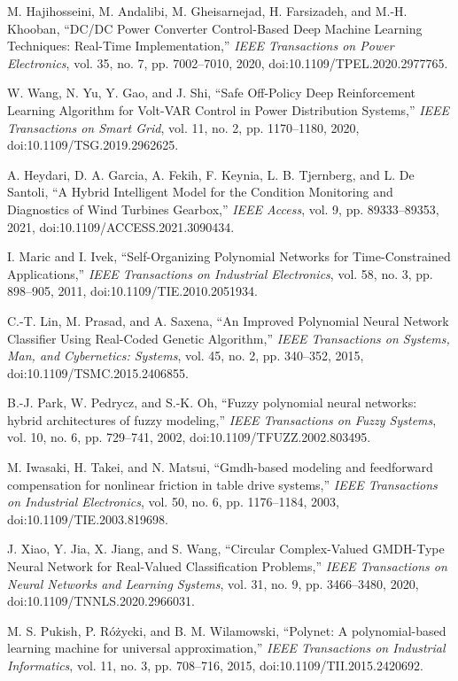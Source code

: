 \documentclass{article} %
\begin{document}
\begin{thebibliography}{99}
M. Hajihosseini, M. Andalibi, M. Gheisarnejad, H. Farsizadeh, and M.-H. Khooban,
``DC/DC Power Converter Control-Based Deep Machine Learning Techniques: Real-Time Implementation,''
\emph{IEEE Transactions on Power Electronics},
vol. 35, no. 7, pp. 7002--7010, 2020,
doi:10.1109/TPEL.2020.2977765.

W. Wang, N. Yu, Y. Gao, and J. Shi,
``Safe Off-Policy Deep Reinforcement Learning Algorithm for Volt-VAR Control in Power Distribution Systems,''
\emph{IEEE Transactions on Smart Grid},
vol. 11, no. 2, pp. 1170--1180, 2020,
doi:10.1109/TSG.2019.2962625.

A. Heydari, D. A. Garcia, A. Fekih, F. Keynia, L. B. Tjernberg, and L. De Santoli,
``A Hybrid Intelligent Model for the Condition Monitoring and Diagnostics of Wind Turbines Gearbox,''
\emph{IEEE Access},
vol. 9, pp. 89333--89353, 2021,
doi:10.1109/ACCESS.2021.3090434.

I. Maric and I. Ivek,
``Self-Organizing Polynomial Networks for Time-Constrained Applications,''
\emph{IEEE Transactions on Industrial Electronics},
vol. 58, no. 3, pp. 898--905, 2011,
doi:10.1109/TIE.2010.2051934.

C.-T. Lin, M. Prasad, and A. Saxena,
``An Improved Polynomial Neural Network Classifier Using Real-Coded Genetic Algorithm,''
\emph{IEEE Transactions on Systems, Man, and Cybernetics: Systems},
vol. 45, no. 2, pp. 340--352, 2015,
doi:10.1109/TSMC.2015.2406855.

B.-J. Park, W. Pedrycz, and S.-K. Oh,
``Fuzzy polynomial neural networks: hybrid architectures of fuzzy modeling,''
\emph{IEEE Transactions on Fuzzy Systems},
vol. 10, no. 6, pp. 729--741, 2002,
doi:10.1109/TFUZZ.2002.803495.

M. Iwasaki, H. Takei, and N. Matsui,
``Gmdh-based modeling and feedforward compensation for nonlinear friction in table drive systems,''
\emph{IEEE Transactions on Industrial Electronics},
vol. 50, no. 6, pp. 1176--1184, 2003,
doi:10.1109/TIE.2003.819698.

J. Xiao, Y. Jia, X. Jiang, and S. Wang,
``Circular Complex-Valued GMDH-Type Neural Network for Real-Valued Classification Problems,''
\emph{IEEE Transactions on Neural Networks and Learning Systems},
vol. 31, no. 9, pp. 3466--3480, 2020,
doi:10.1109/TNNLS.2020.2966031.

M. S. Pukish, P. R{\'o}{\.z}ycki, and B. M. Wilamowski,
``Polynet: A polynomial-based learning machine for universal approximation,''
\emph{IEEE Transactions on Industrial Informatics},
vol. 11, no. 3, pp. 708--716, 2015,
doi:10.1109/TII.2015.2420692.

\end{thebibliography}
\end{document}
